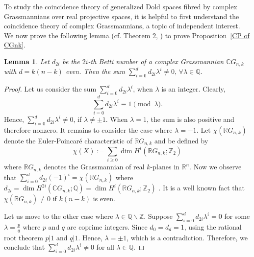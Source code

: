 \documentclass{amsart}
\newtheorem{lemma}[theorem]{Lemma}
\newcommand{\propref}[1]{Proposition~\ref{#1}}
\begin{document}
	To study the coincidence theory of generalized Dold spaces fibred by complex Grassmannians over real projective spaces, it is helpful to first understand the coincidence theory of complex Grassmannians, a topic of independent interest. We now %
prove the following lemma (cf. Theorem 2, \cite{glover-homer}) to %
prove \propref{CP of CGnk}.
	\begin{lemma}\label{sum neq 0}
		Let $d_{2i}$ be the $2i$-th Betti number of a complex Grassmannian $\mathbb CG_{n,k}$ with $d=k(n-k)$ even. Then the sum \(\sum _{i=0}^d d_{2i}\lambda^i\neq 0,\, \forall \lambda \in \mathbb Q.\)
	\end{lemma}
	\begin{proof}
		Let us consider the sum $\sum_{i=0}^d d_{2i}\lambda^i$, when $\lambda$ is an integer. 
		Clearly, $$\sum_{i=0}^d d_{2i}\lambda^i \equiv 1 \pmod{\lambda}.$$ %
		Hence, $\sum_{i=0}^d d_{2i}\lambda^i \neq 0$, if $\lambda \neq \pm 1$. When $\lambda = 1$, the sum is also positive and therefore nonzero. It remains to consider the case where $\lambda = -1$.
		Let $\chi(\mathbb{R}G_{n,k})$ denote the Euler-Poincaré characteristic of $\mathbb{R}G_{n,k}$ and be defined by $$\chi(X):=\sum_{i\ge0}\dim H^i(\mathbb{R}G_{n,k};\mathbb{Z}_2)$$ where $\mathbb{R}G_{n,k}$ denotes the Grassmannian of real $k$-planes in $\mathbb{R}^n$.
		Now we observe %
that 
		$\sum_{i=0}^d d_{2i}(-1)^i = \chi(\mathbb{R}G_{n,k})$ where $d_{2i} = \operatorname{dim} H^{2i}(\mathbb{C}G_{n,k}; \mathbb{Q}) = \dim H^{i}(\mathbb{R}G_{n,k}; \mathbb{Z}_2)$%
. 
		It is a well known fact that $\chi(\mathbb{R}G_{n,k}) \neq 0$ if $k(n-k)$ is even. 
		
		Let us move to the other case where $\lambda\in \mathbb{Q}\backslash \mathbb{Z}$. Suppose $\sum_{i=0}^{d} d_{2i}\lambda^i =0$ for some $\lambda = \frac{p}{q}$ where $p$ and $q$ are coprime integers. Since $d_0 =d_d =1$, using the rational %
root theorem $p|1$ %
and $q|1$. Hence, $\lambda = \pm 1$, which is a contradiction. Therefore, we conclude that $\sum_{i=0}^{d} d_{2i}\lambda^i \neq 0$ for all $\lambda\in \mathbb Q$. 
	\end{proof}
	
\end{document}
